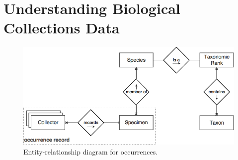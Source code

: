 \chapter{Understanding Biological Collections Data}\label{biodiversity_data}




















\begin{figure}[h!]
  	\centering
    \includegraphics[width=0.8\linewidth]{figures/er_occurrence.png}
    \caption{Entity-relationship diagram for occurrences.}
    \label{fig:er_occurrences}
\end{figure}


